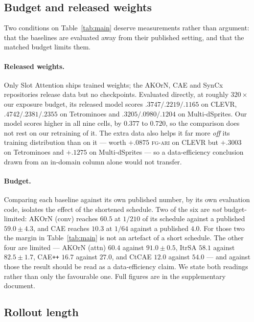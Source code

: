 \subsection{Budget and released weights}
\label{sec:fairness}

Two conditions on Table~\ref{tab:main} deserve measurements rather than argument: that the
baselines are evaluated away from their published setting, and that the matched budget limits
them.

\paragraph{Released weights.}
Only Slot Attention ships trained weights; the AKOrN, CAE and SynCx repositories release data but
no checkpoints. Evaluated directly, at roughly $320\times$ our exposure budget, its released model
scores $.3747/.2219/.1165$ on CLEVR, $.4742/.2381/.2355$ on Tetrominoes and $.3205/.0980/.1204$
on Multi-dSprites. Our model scores higher in all nine cells, by $0.377$ to $0.720$, so the
comparison does not rest on our retraining of it. The extra data also helps it far more \emph{off} its
training distribution than on it --- worth $+.0875$ \textsc{fg-ari} on CLEVR but $+.3003$ on
Tetrominoes and $+.1275$ on Multi-dSprites --- so a data-efficiency conclusion drawn from an
in-domain column alone would not transfer.

\paragraph{Budget.}
Comparing each baseline against its own published number, by its own evaluation code, isolates
the effect of the shortened schedule. Two of the six are \emph{not} budget-limited: AKOrN (conv)
reaches $60.5$ at $1/210$ of its schedule against a published $59.0\pm4.3$, and CAE reaches $10.3$
at $1/64$ against a published $4.0$. For those two the margin in Table~\ref{tab:main} is not an
artefact of a short schedule. The other four are limited --- AKOrN (attn) $60.4$ against
$91.0\pm0.5$, ItrSA $58.1$ against $82.5\pm1.7$, CAE\texttt{++} $16.7$ against $27.0$, and CtCAE
$12.0$ against $54.0$ --- and against those the result should be read as a data-efficiency claim.
We state both readings rather than only the favourable one. Full figures are in the supplementary
document.

\subsection{Rollout length}
\label{sec:timestep}

